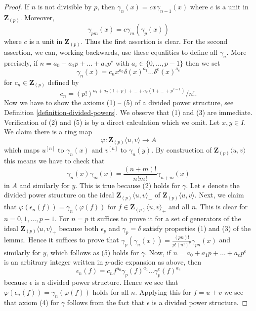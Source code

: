 \begin{proof}
If $n$ is not divisible by $p$, then $\gamma_n(x) = c x \gamma_{n - 1}(x)$
where $c$ is a unit in $\mathbf{Z}_{(p)}$. Moreover,
$$
\gamma_{pm}(x) = c \gamma_m(\gamma_p(x))
$$
where $c$ is a unit in $\mathbf{Z}_{(p)}$. Thus the first assertion is clear.
For the second assertion, we can, working backwards, use these equalities
to define all $\gamma_n$. More precisely, if
$n = a_0 + a_1p + \ldots + a_e p^e$ with $a_i \in \{0, \ldots, p - 1\}$ then
we set
$$
\gamma_n(x) = c_n x^{a_0} \delta(x)^{a_1} \ldots \delta^e(x)^{a_e}
$$
for $c_n \in \mathbf{Z}_{(p)}$ defined by
$$
c_n =
{(p!)^{a_1 + a_2(1 + p) + \ldots + a_e(1 + \ldots + p^{e - 1})}}/{n!}.
$$
Now we have to show the axioms (1) -- (5) of a divided power structure, see
Definition \ref{definition-divided-powers}. We observe that (1) and (3) are
immediate. Verification of (2) and (5) is by a direct calculation which
we omit. Let $x, y \in I$. We claim there is a ring map
$$
\varphi : \mathbf{Z}_{(p)}\langle u, v \rangle \longrightarrow A
$$
which maps $u^{[n]}$ to $\gamma_n(x)$ and $v^{[n]}$ to $\gamma_n(y)$.
By construction of $\mathbf{Z}_{(p)}\langle u, v \rangle$ this means
we have to check that
$$
\gamma_n(x)\gamma_m(x) = \frac{(n + m)!}{n!m!} \gamma_{n + m}(x)
$$
in $A$ and similarly for $y$. This is true because (2) holds for $\gamma$.
Let $\epsilon$ denote the divided power structure on the
ideal $\mathbf{Z}_{(p)}\langle u, v\rangle_{+}$ of
$\mathbf{Z}_{(p)}\langle u, v\rangle$.
Next, we claim that $\varphi(\epsilon_n(f)) = \gamma_n(\varphi(f))$
for $f \in \mathbf{Z}_{(p)}\langle u, v\rangle_{+}$ and all $n$.
This is clear for $n = 0, 1, \ldots, p - 1$. For $n = p$ it suffices
to prove it for a set of generators of the ideal
$\mathbf{Z}_{(p)}\langle u, v\rangle_{+}$ because both $\epsilon_p$
and $\gamma_p = \delta$ satisfy properties (1) and (3) of the lemma.
Hence it suffices to prove that
$\gamma_p(\gamma_n(x)) = \frac{(pn)!}{p!(n!)^p}\gamma_{pn}(x)$ and
similarly for $y$, which follows as (5) holds for $\gamma$.
Now, if $n = a_0 + a_1p + \ldots + a_e p^e$
is an arbitrary integer written in $p$-adic expansion as above, then
$$
\epsilon_n(f) =
c_n f^{a_0} \gamma_p(f)^{a_1} \ldots \gamma_p^e(f)^{a_e}
$$
because $\epsilon$ is a divided power structure. Hence we see that
$\varphi(\epsilon_n(f)) = \gamma_n(\varphi(f))$ holds for all $n$.
Applying this for $f = u + v$ we see that axiom (4) for $\gamma$
follows from the fact that $\epsilon$ is a divided power structure.
\end{proof}













